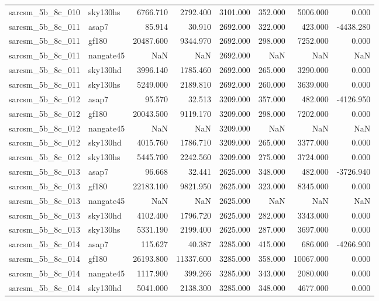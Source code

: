 \begin{tabular}{llrrrrrr}
sarcsm\_5b\_8c\_010 & sky130hs & 6766.710 & 2792.400 & 3101.000 & 352.000 & 5006.000 & 0.000 \\
sarcsm\_5b\_8c\_011 & asap7 & 85.914 & 30.910 & 2692.000 & 322.000 & 423.000 & -4438.280 \\
sarcsm\_5b\_8c\_011 & gf180 & 20487.600 & 9344.970 & 2692.000 & 298.000 & 7252.000 & 0.000 \\
sarcsm\_5b\_8c\_011 & nangate45 & NaN & NaN & 2692.000 & NaN & NaN & NaN \\
sarcsm\_5b\_8c\_011 & sky130hd & 3996.140 & 1785.460 & 2692.000 & 265.000 & 3290.000 & 0.000 \\
sarcsm\_5b\_8c\_011 & sky130hs & 5249.000 & 2189.810 & 2692.000 & 260.000 & 3639.000 & 0.000 \\
sarcsm\_5b\_8c\_012 & asap7 & 95.570 & 32.513 & 3209.000 & 357.000 & 482.000 & -4126.950 \\
sarcsm\_5b\_8c\_012 & gf180 & 20043.500 & 9119.170 & 3209.000 & 298.000 & 7202.000 & 0.000 \\
sarcsm\_5b\_8c\_012 & nangate45 & NaN & NaN & 3209.000 & NaN & NaN & NaN \\
sarcsm\_5b\_8c\_012 & sky130hd & 4015.760 & 1786.710 & 3209.000 & 265.000 & 3377.000 & 0.000 \\
sarcsm\_5b\_8c\_012 & sky130hs & 5445.700 & 2242.560 & 3209.000 & 275.000 & 3724.000 & 0.000 \\
sarcsm\_5b\_8c\_013 & asap7 & 96.668 & 32.441 & 2625.000 & 348.000 & 482.000 & -3726.940 \\
sarcsm\_5b\_8c\_013 & gf180 & 22183.100 & 9821.950 & 2625.000 & 323.000 & 8345.000 & 0.000 \\
sarcsm\_5b\_8c\_013 & nangate45 & NaN & NaN & 2625.000 & NaN & NaN & NaN \\
sarcsm\_5b\_8c\_013 & sky130hd & 4102.400 & 1796.720 & 2625.000 & 282.000 & 3343.000 & 0.000 \\
sarcsm\_5b\_8c\_013 & sky130hs & 5331.190 & 2199.400 & 2625.000 & 287.000 & 3697.000 & 0.000 \\
sarcsm\_5b\_8c\_014 & asap7 & 115.627 & 40.387 & 3285.000 & 415.000 & 686.000 & -4266.900 \\
sarcsm\_5b\_8c\_014 & gf180 & 26193.800 & 11337.600 & 3285.000 & 358.000 & 10067.000 & 0.000 \\
sarcsm\_5b\_8c\_014 & nangate45 & 1117.900 & 399.266 & 3285.000 & 343.000 & 2080.000 & 0.000 \\
sarcsm\_5b\_8c\_014 & sky130hd & 5041.000 & 2138.300 & 3285.000 & 348.000 & 4677.000 & 0.000 \\

\end{tabular}

